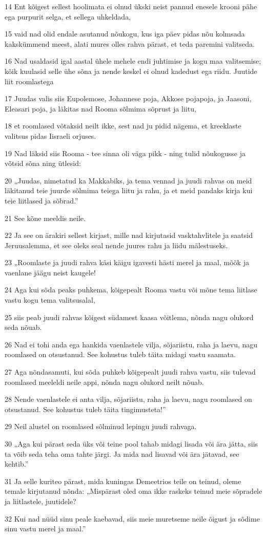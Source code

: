 \par 14 Ent kõigest sellest hoolimata ei olnud ükski neist pannud enesele krooni pähe ega purpurit selga, et sellega uhkeldada,
\par 15 vaid nad olid endale asutanud nõukogu, kus iga päev pidas nõu kolmsada kakskümmend meest, alati mures olles rahva pärast, et teda paremini valitseda.
\par 16 Nad usaldasid igal aastal ühele mehele endi juhtimise ja kogu maa valitsemise; kõik kuulasid selle ühe sõna ja nende keskel ei olnud kadedust ega riidu. Juutide liit roomlastega
\par 17 Juudas valis siis Eupolemose, Johannese poja, Akkose pojapoja, ja Jaasoni, Eleasari poja, ja läkitas nad Rooma sõlmima sõprust ja liitu,
\par 18 et roomlased võtaksid neilt ikke, sest nad ju pidid nägema, et kreeklaste valitsus pidas Iisraeli orjuses.
\par 19 Nad läksid siis Rooma - tee sinna oli väga pikk - ning tulid nõukogusse ja võtsid sõna ning ütlesid:
\par 20 „Juudas, nimetatud ka Makkabiks, ja tema vennad ja juudi rahvas on meid läkitanud teie juurde sõlmima teiega liitu ja rahu, ja et meid pandaks kirja kui teie liitlased ja sõbrad.”
\par 21 See kõne meeldis neile.
\par 22 Ja see on ärakiri sellest kirjast, mille nad kirjutasid vasktahvlitele ja saatsid Jeruusalemma, et see oleks seal nende juures rahu ja liidu mälestuseks.
\par 23 „Roomlaste ja juudi rahva käsi käigu igavesti hästi merel ja maal, mõõk ja vaenlane jäägu neist kaugele!
\par 24 Aga kui sõda peaks puhkema, kõigepealt Rooma vastu või mõne tema liitlase vastu kogu tema valitsusalal,
\par 25 siis peab juudi rahvas kõigest südamest kaasa võitlema, nõnda nagu olukord seda nõuab.
\par 26 Nad ei tohi anda ega hankida vaenlastele vilja, sõjariistu, raha ja laevu, nagu roomlased on otsustanud. See kohustus tuleb täita midagi vastu saamata.
\par 27 Aga nõndasamuti, kui sõda puhkeb kõigepealt juudi rahva vastu, siis tulevad roomlased meeleldi neile appi, nõnda nagu olukord neilt nõuab.
\par 28 Nende vaenlastele ei anta vilja, sõjariistu, raha ja laevu, nagu roomlased on otsustanud. See kohustus tuleb täita tingimusteta!”
\par 29 Neil alustel on roomlased sõlminud lepingu juudi rahvaga.
\par 30 „Aga kui pärast seda üks või teine pool tahab midagi lisada või ära jätta, siis ta võib seda teha oma tahte järgi. Ja mida nad lisavad või ära jätavad, see kehtib.”
\par 31 Ja selle kuriteo pärast, mida kuningas Demeetrios teile on teinud, oleme temale kirjutanud nõnda: „Mispärast oled oma ikke raskeks teinud meie sõpradele ja liitlastele, juutidele?
\par 32 Kui nad nüüd sinu peale kaebavad, siis meie muretseme neile õigust ja sõdime sinu vastu merel ja maal.”

